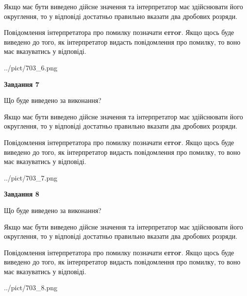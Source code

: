 \documentclass[12pt, ukrainian]{article}
\begin{document}
{\begin {Large}
Якщо має бути виведено дійсне значення та інтерпретатор має здійснювати його округлення, 
то у відповіді достатньо правильно вказати два дробових розряди.

Повідомлення інтерпретатора про помилку позначати \textbf{error}.
Якщо щось буде виведено до того, як інтерпретатор видасть повідомлення про помилку, 
то воно має вказуватись у відповіді. \par

\begin{center}
	{../pict/703_6.png}
\end{center}
\newpage

{\begin {center}\textbf{Завдання 7}\end {center}}\par
Що буде виведено за виконання? \par

Якщо має бути виведено дійсне значення та інтерпретатор має здійснювати його округлення, 
то у відповіді достатньо правильно вказати два дробових розряди.

Повідомлення інтерпретатора про помилку позначати \textbf{error}.
Якщо щось буде виведено до того, як інтерпретатор видасть повідомлення про помилку, 
то воно має вказуватись у відповіді. \par

\begin{center}
	{../pict/703_7.png}
\end{center}
\newpage

{\begin {center}\textbf{Завдання 8}\end {center}}\par
Що буде виведено за виконання? \par

Якщо має бути виведено дійсне значення та інтерпретатор має здійснювати його округлення, 
то у відповіді достатньо правильно вказати два дробових розряди.

Повідомлення інтерпретатора про помилку позначати \textbf{error}.
Якщо щось буде виведено до того, як інтерпретатор видасть повідомлення про помилку, 
то воно має вказуватись у відповіді. \par

\begin{center}
	{../pict/703_8.png}
\end{center}
\newpage


\end{Large}}
\end{document}
